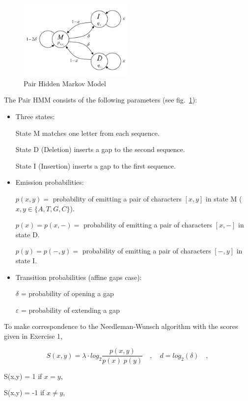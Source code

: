 \documentclass[a4paper,11pt]{article}
\begin{document}
\begin{figure}[h]
\begin{center}
\includegraphics[width=0.5\textwidth]{HMM.jpg}
\caption{Pair Hidden Markov Model}
\label{fig:HMM}
\end{center}
\end{figure}


The Pair HMM consists of the following parameters (see fig.~\ref{fig:HMM}):

\begin{itemize}
\item Three states:

State M matches one letter from each sequence.

State D (Deletion) inserts a gap to the second sequence.

State I (Insertion) inserts a gap to the first sequence.

\item Emission probabilities:

$p(x,y) =$ probability of emitting a pair of characters $[x,y]$ in state M ($x,y \in \{A,T,G,C\}$).

$p(x) = p(x,-) =$ probability of emitting a pair of characters $[x,-]$ in state D.

$p(y) = p(-,y) =$ probability of emitting a pair of characters $[-,y]$ in state I.

\item Transition probabilities (affine gaps case):

$\delta$ = probability of opening a gap

$\varepsilon$ = probability of extending a gap
\end{itemize}

To make correspondence to the Needleman-Wunsch algorithm with the scores given in Exercise 1,


$$S(x,y)=\lambda \cdot log_2\frac{p(x,y)}{p(x)\; p(y)} \quad , \quad d=log_2(\delta) \quad ,$$

S(x,y) = 1 if $x=y$, 

S(x,y) = -1 if $x\neq y$,
\end{document}
